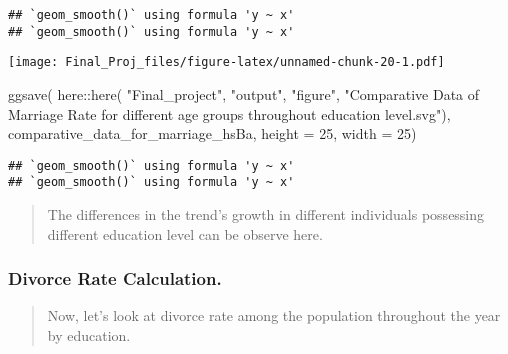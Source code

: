 \documentclass[
]{article}
\newenvironment{Shaded}{\begin{snugshade}}{\end{snugshade}}
\newcommand{\AttributeTok}[1]{\textcolor[rgb]{0.77,0.63,0.00}{#1}}
\newcommand{\DecValTok}[1]{\textcolor[rgb]{0.00,0.00,0.81}{#1}}
\newcommand{\FunctionTok}[1]{\textcolor[rgb]{0.00,0.00,0.00}{#1}}
\newcommand{\NormalTok}[1]{#1}
\newcommand{\SpecialCharTok}[1]{\textcolor[rgb]{0.00,0.00,0.00}{#1}}
\newcommand{\StringTok}[1]{\textcolor[rgb]{0.31,0.60,0.02}{#1}}
\begin{document}
\begin{verbatim}
## `geom_smooth()` using formula 'y ~ x'
## `geom_smooth()` using formula 'y ~ x'
\end{verbatim}

\texttt{[image: Final\_Proj\_files/figure-latex/unnamed-chunk-20-1.pdf]}

\begin{Shaded}
\begin{Highlighting}[]
\FunctionTok{ggsave}\NormalTok{(}
\NormalTok{  here}\SpecialCharTok{::}\FunctionTok{here}\NormalTok{(}
    \StringTok{"Final\_project"}\NormalTok{,}
    \StringTok{"output"}\NormalTok{,}
    \StringTok{"figure"}\NormalTok{,}
    \StringTok{"Comparative Data of Marriage Rate for different age groups throughout education level.svg"}\NormalTok{),}
\NormalTok{       comparative\_data\_for\_marriage\_hsBa,}
       \AttributeTok{height =} \DecValTok{25}\NormalTok{,}
       \AttributeTok{width =} \DecValTok{25}\NormalTok{)}
\end{Highlighting}
\end{Shaded}

\begin{verbatim}
## `geom_smooth()` using formula 'y ~ x'
## `geom_smooth()` using formula 'y ~ x'
\end{verbatim}

\begin{quote}
The differences in the trend's growth in different individuals
possessing different education level can be observe here.
\end{quote}

\hypertarget{divorce-rate-calculation.}{%
\subsubsection{Divorce Rate
Calculation.}\label{divorce-rate-calculation.}}

\begin{quote}
Now, let's look at divorce rate among the population throughout the year
by education.
\end{quote}
\end{document}
